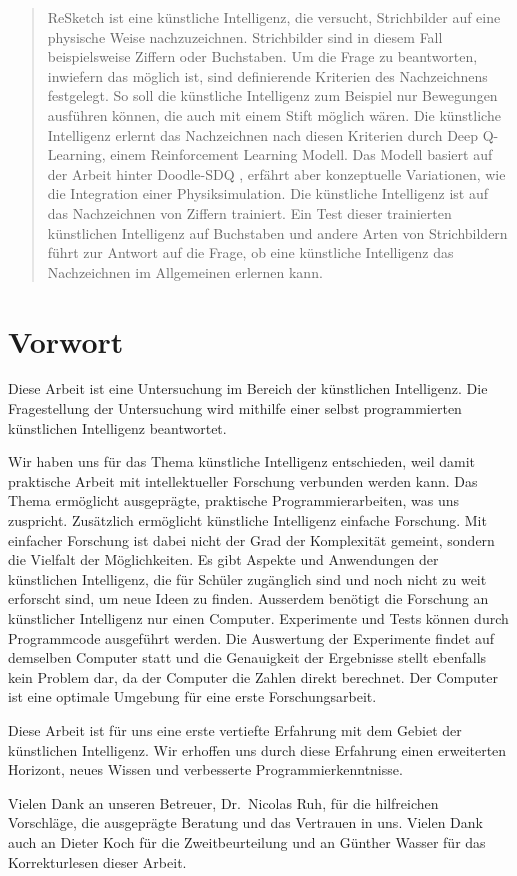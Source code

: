 \begin{abstract}\label{abstract} ReSketch ist eine künstliche Intelligenz, die
versucht, Strichbilder auf eine physische Weise nachzuzeichnen. Strichbilder
sind in diesem Fall beispielsweise Ziffern oder Buchstaben. Um die Frage zu
beantworten, inwiefern das möglich ist, sind definierende Kriterien des
Nachzeichnens festgelegt. So soll die künstliche Intelligenz zum Beispiel nur
Bewegungen ausführen können, die auch mit einem Stift möglich wären. Die
künstliche Intelligenz erlernt das Nachzeichnen nach diesen Kriterien durch Deep
Q-Learning, einem Reinforcement Learning Modell. Das Modell basiert auf der
Arbeit hinter Doodle-SDQ \cite{zhou_learning_2018}, erfährt aber konzeptuelle
Variationen, wie die Integration einer Physiksimulation. Die künstliche
Intelligenz ist auf das Nachzeichnen von Ziffern trainiert. Ein Test dieser
trainierten künstlichen Intelligenz auf Buchstaben und andere Arten von
Strichbildern führt zur Antwort auf die Frage, ob eine künstliche Intelligenz
das Nachzeichnen im Allgemeinen erlernen kann.
\end{abstract}
    
\newpage
    
\section*{Vorwort}\label{vorwort} Diese Arbeit ist eine Untersuchung im Bereich
der künstlichen Intelligenz. Die Fragestellung der Untersuchung wird mithilfe
einer selbst programmierten künstlichen Intelligenz beantwortet.
    
Wir haben uns für das Thema künstliche Intelligenz entschieden, weil damit
praktische Arbeit mit intellektueller Forschung verbunden werden kann. Das Thema
ermöglicht ausgeprägte, praktische Programmierarbeiten, was uns zuspricht.
Zusätzlich ermöglicht künstliche Intelligenz einfache Forschung. Mit einfacher
Forschung ist dabei nicht der Grad der Komplexität gemeint, sondern die Vielfalt
der Möglichkeiten. Es gibt Aspekte und Anwendungen der künstlichen Intelligenz,
die für Schüler zugänglich sind und noch nicht zu weit erforscht sind, um neue
Ideen zu finden. Ausserdem benötigt die Forschung an künstlicher Intelligenz nur
einen Computer. Experimente und Tests können durch Programmcode ausgeführt
werden. Die Auswertung der Experimente findet auf demselben Computer statt und
die Genauigkeit der Ergebnisse stellt ebenfalls kein Problem dar, da der
Computer die Zahlen direkt berechnet. Der Computer ist eine optimale Umgebung
für eine erste Forschungsarbeit.
    
Diese Arbeit ist für uns eine erste vertiefte Erfahrung mit dem Gebiet der
künstlichen Intelligenz. Wir erhoffen uns durch diese Erfahrung einen
erweiterten Horizont, neues Wissen und verbesserte Programmierkenntnisse.
    
Vielen Dank an unseren Betreuer, Dr.\ Nicolas Ruh, für die hilfreichen
Vorschläge, die ausgeprägte Beratung und das Vertrauen in uns. Vielen Dank auch
an Dieter Koch für die Zweitbeurteilung und an Günther Wasser für das
Korrekturlesen dieser Arbeit.
    